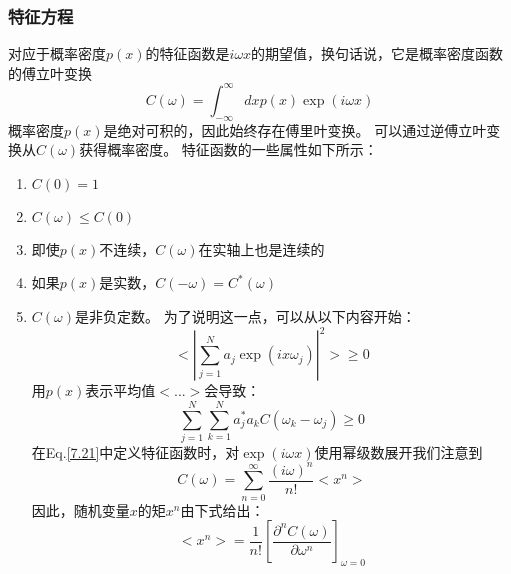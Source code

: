 \documentclass[12pt, UTF8]{ctexart}%
\numberwithin{equation}{section}
\numberwithin{figure}{section}
\newcommand{\InsertEqution}[2]{\begin{equation}
  \label{#1}
   #2
 \end{equation}}
\newcommand{\RefEq}[1]{Eq.\ref{#1}}
\newcommand{\InsertInlineEq}[1]{$#1$}
\newcommand{\InsertItem}[1]{\begin{enumerate} #1 \end{enumerate}}
\begin{document}
\begin{sloppypar}
\subsubsection{特征方程}
对应于概率密度\InsertInlineEq{p(x)}的特征函数是\InsertInlineEq{i\omega x}的期望值，换句话说，它是概率密度函数的傅立叶变换
\InsertEqution{7.21}{C(\omega)=\int_{-\infty}^{\infty} d x p(x) \exp (i \omega x)}
概率密度\InsertInlineEq{p(x)}是绝对可积的，因此始终存在傅里叶变换。 可以通过逆傅立叶变换从\InsertInlineEq{C(\omega)}获得概率密度。 特征函数的一些属性如下所示：
\InsertItem{
  \item \InsertInlineEq{C(0)=1}
  \item \InsertInlineEq{C(\omega)\leq C(0)}
  \item 即使\InsertInlineEq{p(x)}不连续，\InsertInlineEq{C(\omega)}在实轴上也是连续的
  \item 如果\InsertInlineEq{p(x)}是实数，\InsertInlineEq{C(-\omega)=C^*(\omega)}
  \item \InsertInlineEq{C(\omega)}是非负定数。 为了说明这一点，可以从以下内容开始：\InsertEqution{7.22}{<\left|\sum_{j=1}^{N} a_{j} \exp \left(i x \omega_{j}\right)\right|^{2}>\geq 0}用\InsertInlineEq{p(x)}表示平均值\InsertInlineEq{<...>}会导致：\InsertEqution{7.23}{\sum_{j=1}^{N} \sum_{k=1}^{N} a_{j}^{*} a_{k} C\left(\omega_{k}-\omega_{j}\right) \geq 0}在\RefEq{7.21}中定义特征函数时，对\InsertInlineEq{\exp (i \omega x)}使用幂级数展开我们注意到\InsertEqution{7.24}{C(\omega)=\sum_{n=0}^{\infty} \frac{(i \omega)^{n}}{n !}<x^{n}>}因此，随机变量\InsertInlineEq{x}的矩\InsertInlineEq{x^n}由下式给出：\InsertEqution{7.25}{<x^{n}>=\frac{1}{n !}\left[\frac{\partial^{n} C(\omega)}{\partial \omega^{n}}\right]_{\omega=0}}
}

\end{sloppypar}
\end{document}
